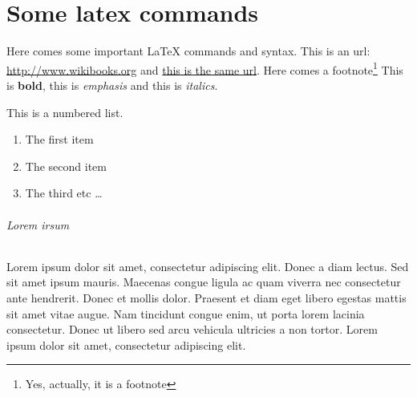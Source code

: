 \part{Some latex commands}

Here comes some important LaTeX commands and syntax.
This is an url: \url{http://www.wikibooks.org} and
\href{http://www.wikibooks.org}{this is the same url}.
Here comes a footnote\footnote{Yes, actually, it is a footnote}
This is \textbf{bold}, this is \emph{emphasis} and this is \textit{italics}.

This is a numbered list.
\begin{enumerate}
   \item The first item
   \item The second item
   \item The third etc \ldots
\end{enumerate}

\paragraph{Lorem irsum}
Lorem ipsum dolor sit amet, consectetur adipiscing elit. Donec a diam lectus.
Sed sit amet ipsum mauris. Maecenas congue ligula ac quam viverra nec
consectetur ante hendrerit. Donec et mollis dolor. Praesent et diam eget
libero egestas mattis sit amet vitae augue. Nam tincidunt congue enim, ut
porta lorem lacinia consectetur. Donec ut libero sed arcu vehicula ultricies a
non tortor. Lorem ipsum dolor sit amet, consectetur adipiscing elit.

